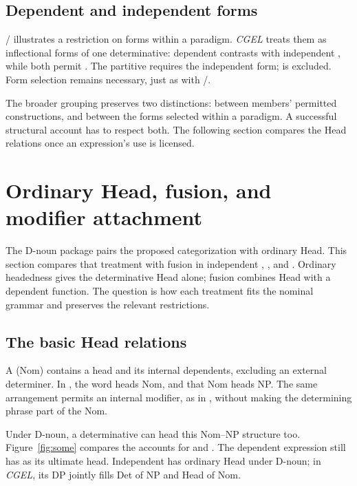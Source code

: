 \documentclass[12pt]{article}
\begin{document}
\subsection{Dependent and independent forms}\label{sec:form-selection}

/ illustrates a restriction on forms within a paradigm. \textit{CGEL} treats them as inflectional forms of one determinative: dependent  contrasts with independent , while both permit  \citep[389--390]{huddleston2002}. The partitive  requires the independent form;  is excluded. Form selection remains necessary, just as with /.

The broader grouping preserves two distinctions: between members' permitted constructions, and between the forms selected within a paradigm. A successful structural account has to respect both. The following section compares the Head relations once an expression's use is licensed.

\section{Ordinary Head, fusion, and modifier attachment}\label{sec:evidence}

The D-noun package pairs the proposed categorization with ordinary Head. This section compares that treatment with fusion in independent , , and . Ordinary headedness gives the determinative Head alone; fusion combines Head with a dependent function. The question is how each treatment fits the nominal grammar and preserves the relevant restrictions.

\subsection{The basic Head relations}\label{sec:head-relations}

A  (Nom) contains a head and its internal dependents, excluding an external determiner. In , the word  heads Nom, and that Nom heads NP. The same arrangement permits an internal modifier, as in , without making the determining phrase part of the Nom.

Under D-noun, a determinative can head this Nom--NP structure too. Figure~\ref{fig:some} compares the accounts for  and . The dependent expression still has  as its ultimate head. Independent  has ordinary Head under D-noun; in \textit{CGEL}, its DP jointly fills Det of NP and Head of Nom.
\end{document}
